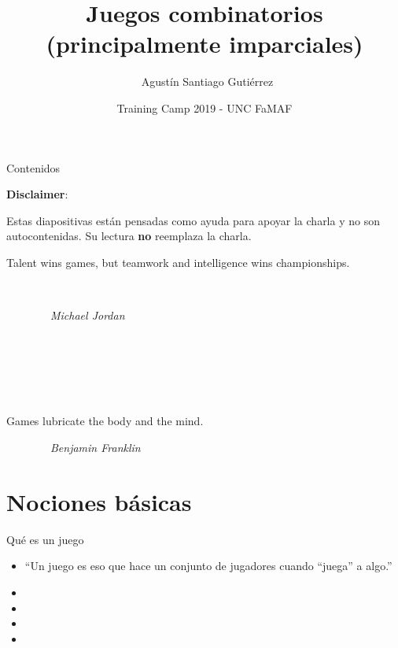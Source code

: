 \documentclass{beamer}
\title[Teoría de Juegos] %
{Juegos combinatorios (principalmente imparciales)}
\author[Agustín Gutiérrez] %
{~Agustín Santiago Gutiérrez}
\institute[UBA] %
{
  Facultad de Ciencias Exactas y Naturales\\
  Universidad de Buenos Aires
}
\date[TC 2019] %
{Training Camp 2019 - UNC FaMAF}
\begin{document}
\begin{frame}
  \titlepage
\end{frame}

\begin{frame}{Contenidos}
  \tableofcontents
\end{frame}

\begin{frame}
  \textbf{Disclaimer}:
  
  Estas diapositivas están pensadas como ayuda para apoyar la charla y no son autocontenidas. Su lectura \textbf{no} reemplaza la charla.
\end{frame}

\begin{frame}
  Talent wins games, but teamwork and intelligence wins championships.
  
  \ 
  
  \ \ \ \ \ \ \ \ \textit{Michael Jordan}

  \ 
  
  \ 
  
  \ 

  Games lubricate the body and the mind.

  \ \ \ \ \ \ \ \ \textit{Benjamin Franklin}
\end{frame}


\section{Nociones básicas}


\begin{frame}{Qué es un juego}
  \begin{itemize}
  
  \item ``Un juego es eso que hace un conjunto de jugadores cuando ``juega'' a algo.''
  \pause
  \item {}
  \pause
  \item {}
  \pause
  \item {}
  \pause
  \item {}
  \end{itemize}
\end{frame}
\end{document}
